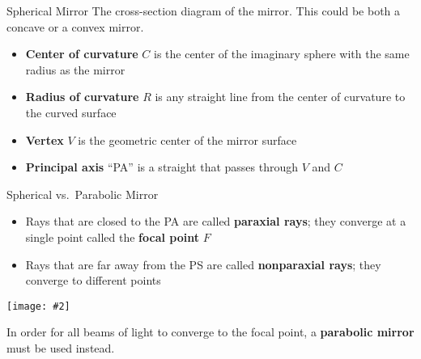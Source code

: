 \documentclass[compress,aspectratio=169]{beamer}
\newcommand{\pic}[2]{\texttt{[image: \#2]}}
\begin{document}
\begin{frame}{Spherical Mirror}
  The cross-section diagram of the mirror. This could be both a concave or a
  convex mirror.
  \begin{center}
  \end{center}
  \begin{itemize}
  \item\textbf{Center of curvature} $C$ is the center of the imaginary sphere
    with the same radius as the mirror
  \item\textbf{Radius of curvature} $R$ is any straight line from the
    center of curvature to the curved surface
  \item\textbf{Vertex} $V$ is the geometric center of the mirror surface
  \item\textbf{Principal axis} ``PA'' is a straight that passes through $V$ and
    $C$
  \end{itemize}
\end{frame}


\begin{frame}{Spherical vs.\ Parabolic Mirror}
  \begin{itemize}
  \item Rays that are closed to the PA are called \textbf{paraxial rays}; they
    converge at a single point called the \textbf{focal point} $F$
  \item Rays that are far away from the PS are called \textbf{nonparaxial rays};
    they converge to different points
  \end{itemize}
  \begin{center}
    \pic{.6}{graphics/spherical-vs-parabolic.png}
  \end{center}
  In order for all beams of light to converge to the focal point, a
  \textbf{parabolic mirror} must be used instead.
\end{frame}
\end{document}
